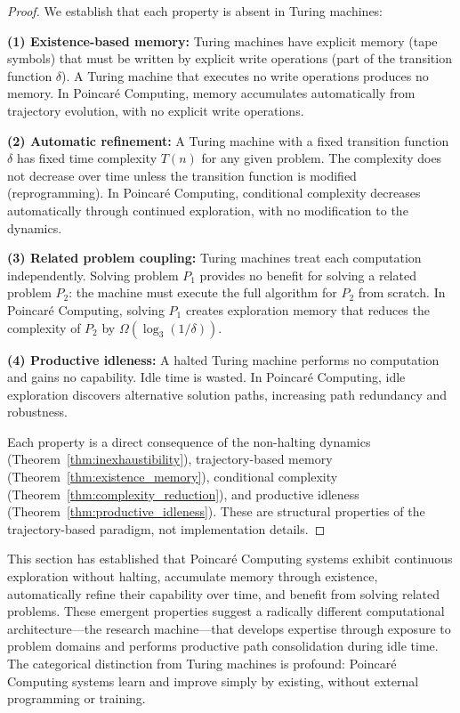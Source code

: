\begin{proof}
We establish that each property is absent in Turing machines:

\textbf{(1) Existence-based memory:} Turing machines have explicit memory (tape symbols) that must be written by explicit write operations (part of the transition function $\delta$). A Turing machine that executes no write operations produces no memory. In Poincaré Computing, memory accumulates automatically from trajectory evolution, with no explicit write operations.

\textbf{(2) Automatic refinement:} A Turing machine with a fixed transition function $\delta$ has fixed time complexity $T(n)$ for any given problem. The complexity does not decrease over time unless the transition function is modified (reprogramming). In Poincaré Computing, conditional complexity decreases automatically through continued exploration, with no modification to the dynamics.

\textbf{(3) Related problem coupling:} Turing machines treat each computation independently. Solving problem $P_1$ provides no benefit for solving a related problem $P_2$: the machine must execute the full algorithm for $P_2$ from scratch. In Poincaré Computing, solving $P_1$ creates exploration memory that reduces the complexity of $P_2$ by $\Omega(\log_3(1/\delta))$.

\textbf{(4) Productive idleness:} A halted Turing machine performs no computation and gains no capability. Idle time is wasted. In Poincaré Computing, idle exploration discovers alternative solution paths, increasing path redundancy and robustness.

Each property is a direct consequence of the non-halting dynamics (Theorem~\ref{thm:inexhaustibility}), trajectory-based memory (Theorem~\ref{thm:existence_memory}), conditional complexity (Theorem~\ref{thm:complexity_reduction}), and productive idleness (Theorem~\ref{thm:productive_idleness}). These are structural properties of the trajectory-based paradigm, not implementation details.
\end{proof}

This section has established that Poincaré Computing systems exhibit continuous exploration without halting, accumulate memory through existence, automatically refine their capability over time, and benefit from solving related problems. These emergent properties suggest a radically different computational architecture—the research machine—that develops expertise through exposure to problem domains and performs productive path consolidation during idle time. The categorical distinction from Turing machines is profound: Poincaré Computing systems learn and improve simply by existing, without external programming or training.

